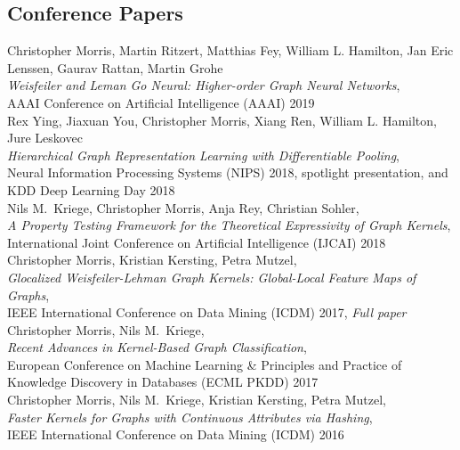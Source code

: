 \documentclass[11pt, a4paper]{scrartcl}
\newcommand{\years}[1]{\marginnote {\bf #1}}
\begin{document}
\subsection*{Conference Papers}

\years{2019}Christopher Morris, Martin Ritzert, Matthias Fey, William L. Hamilton, Jan Eric Lenssen, Gaurav Rattan, Martin Grohe  \\
\emph{Weisfeiler and Leman Go Neural: Higher-order Graph Neural Networks},\\
AAAI Conference on Artificial Intelligence (AAAI) 2019 \\


\years{2018} Rex Ying, Jiaxuan You, Christopher Morris, Xiang Ren, William L. Hamilton, Jure Leskovec \\
\emph{Hierarchical Graph Representation Learning with Differentiable Pooling},\\
 Neural Information Processing Systems (NIPS) 2018, spotlight presentation, and KDD Deep Learning Day 2018 \\

Nils M.~Kriege, Christopher Morris, Anja Rey, Christian Sohler,\\
\emph{A Property Testing Framework for the Theoretical Expressivity of Graph Kernels},\\
International Joint Conference on Artificial Intelligence (IJCAI) 2018\\

\years{2017} Christopher Morris, Kristian Kersting, Petra Mutzel,\\
\emph{Glocalized Weisfeiler-Lehman Graph Kernels: Global-Local Feature Maps of Graphs},\\
IEEE International Conference on Data Mining (ICDM) 2017, \emph{Full paper}\\

 Christopher Morris, Nils M.~Kriege,\\
\emph{Recent Advances in Kernel-Based Graph Classification},\\
European Conference on Machine Learning \& Principles and Practice of Knowledge Discovery in Databases (ECML PKDD) 2017\\

\years{2016} Christopher Morris, Nils M.~Kriege, Kristian Kersting, Petra Mutzel,\\
\emph{Faster Kernels for Graphs with Continuous Attributes via Hashing},\\
IEEE International Conference on Data Mining (ICDM) 2016
\end{document}
